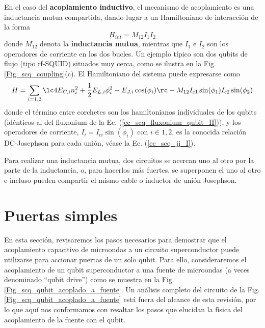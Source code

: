        En el caso del \textbf{acoplamiento inductivo}, el mecanismo de acoplamiento es una inductancia mutua compartida, dando lugar a un Hamiltoniano de interacción de la forma
        \begin{equation}
            H_{int} = M_{12} I_1 I_2
        \end{equation}
        donde $M_{12}$ denota la \textbf{inductancia mutua}, mientras que $I_1$ e $I_2$ son los operadores de corriente en los dos bucles. Un ejemplo típico son dos qubits de flujo (tipo rf-SQUID) situados muy cerca, como se ilustra en la Fig. \ref{Fig_scq_coupling}(c). El Hamiltoniano del sistema puede expresarse como
        \begin{equation}
            H = \sum_{i=1,2} \lc 4 E_{C,i} n_i^2 + \frac{1}{2} E_{L,i} \phi_i^2 - E_{J,i} \cos (\phi_i)  \rc 
            + M_{12} I_{c1} \sin(\phi_1) I_{c2} \sin(\phi_2)
        \end{equation}
        donde el término entre corchetes son los hamiltonianos individuales de los qubits (idénticos al del fluxonium de la Ec. (\ref{ec_scq_fluxonium_qubit_H})), y los operadores de corriente, $I_i = I_{ci} \sin(\phi_i)$ con $i \in 1,2$, es la conocida relación DC-Josephson para cada unión, véase la Ec. (\ref{ec_scq_jj_I}). 

        Para realizar una inductancia mutua, dos circuitos se acercan uno al otro por la parte de la inductancia, o, para hacerlos más fuertes, se superponen el uno al otro e incluso pueden compartir el mismo cable o inductor de unión Josephson.

    
    
    









\newpage
\section{Puertas simples} \label{sec_scq_puertas_1_qubits}

En esta sección, revisaremos los pasos necesarios para demostrar que el acoplamiento capacitivo de microondas a un circuito superconductor puede utilizarse para accionar puertas de un solo qubit. Para ello, consideraremos el acoplamiento de un qubit superconductor a una fuente de microondas (a veces denominado ``qubit drive'') como se muestra en la Fig. \ref{Fig_scq_qubit_acoplado_a_fuente}. Un análisis completo del circuito de la Fig. \ref{Fig_scq_qubit_acoplado_a_fuente} está fuera del alcance de esta revisión, por lo que aquí nos conformamos con resaltar los pasos que elucidan la física del acoplamiento de la fuente con el qubit. 


